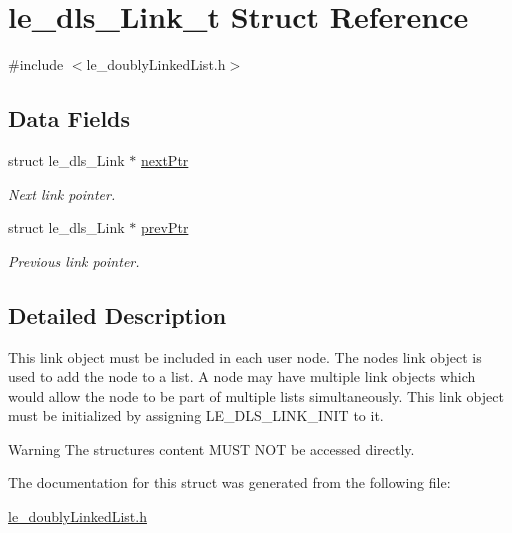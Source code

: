 \hypertarget{structle__dls___link__t}{}\section{le\+\_\+dls\+\_\+\+Link\+\_\+t Struct Reference}
\label{structle__dls___link__t}


{\ttfamily \#include $<$le\+\_\+doubly\+Linked\+List.\+h$>$}

\subsection*{Data Fields}
\begin{DoxyCompactItemize}
\item 
struct le\+\_\+dls\+\_\+\+Link $\ast$ \hyperlink{structle__dls___link__t_aeb5c99f0b4fb15daefef9b81f04b98dc}{next\+Ptr}\hypertarget{structle__dls___link__t_aeb5c99f0b4fb15daefef9b81f04b98dc}{}\label{structle__dls___link__t_aeb5c99f0b4fb15daefef9b81f04b98dc}

\begin{DoxyCompactList}\small\item\em Next link pointer. \end{DoxyCompactList}\item 
struct le\+\_\+dls\+\_\+\+Link $\ast$ \hyperlink{structle__dls___link__t_acf978c7d31cf7ab2aa0f7b36603f4a12}{prev\+Ptr}\hypertarget{structle__dls___link__t_acf978c7d31cf7ab2aa0f7b36603f4a12}{}\label{structle__dls___link__t_acf978c7d31cf7ab2aa0f7b36603f4a12}

\begin{DoxyCompactList}\small\item\em Previous link pointer. \end{DoxyCompactList}\end{DoxyCompactItemize}


\subsection{Detailed Description}
This link object must be included in each user node. The node\textquotesingle{}s link object is used to add the node to a list. A node may have multiple link objects which would allow the node to be part of multiple lists simultaneously. This link object must be initialized by assigning L\+E\+\_\+\+D\+L\+S\+\_\+\+L\+I\+N\+K\+\_\+\+I\+N\+IT to it.

\begin{DoxyWarning}{Warning}
The structure\textquotesingle{}s content M\+U\+ST N\+OT be accessed directly. 
\end{DoxyWarning}


The documentation for this struct was generated from the following file\+:\begin{DoxyCompactItemize}
\item 
\hyperlink{le__doubly_linked_list_8h}{le\+\_\+doubly\+Linked\+List.\+h}\end{DoxyCompactItemize}
